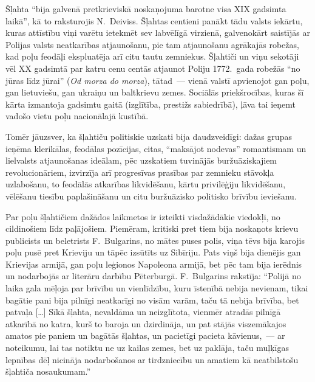 \documentclass[twoside,a5paper,12pt,fleqn,openany]{extbook}
\newcommand{\pltxti}[1]{\textit{\textpolish{#1}}}
\newcommand{\citespace}{[\dots{}]}
\begin{document}
Šļahta ``bija galvenā pretkrieviskā noskaņojuma barotne visa XIX gadsimta laikā'', kā to raksturojis N.~Deiviss. Šļahtas centieni panākt tādu valsts iekārtu, kuras attīstību viņi varētu ietekmēt sev labvēlīgā virzienā, galvenokārt saistījās ar Polijas valsts neatkarības atjaunošanu, pie tam atjaunošanu agrākajās robežas, kad poļu feodāļi ekspluatēja arī citu tautu zemniekus. Šļahtiči un viņu sekotāji vēl XX gadsimtā par katru cenu centās atjaunot Poliju 1772.~gada robežās ``no jūras līdz jūrai'' (\pltxti{Od morza do morza}), tātad~--- vienā valstī apvienojot gan poļu, gan lietuviešu, gan ukraiņu un baltkrievu zemes. Sociālās priekšrocības, kuras šī kārta izmantoja gadsimtu gaitā (izglītība, prestižs sabiedrībā), ļāva tai ieņemt vadošo vietu poļu nacionālajā kustībā.

Tomēr jāuzsver, ka šļahtiču politiskie uzskati bija daudzveidīgi: dažas grupas ieņēma klerikālas, feodālas pozīcijas, citas, ``maksājot nodevas'' romantismam un lielvalsts atjaunošanas ideālam, pēc uzskatiem tuvinājās buržuāziskajiem revolucionāriem, izvirzīja arī progresīvas prasības par zemnieku stāvokļa uzlabošanu, to feodālās atkarības likvidēšanu, kārtu privilēģiju likvidēšanu, vēlēšanu tiesību paplašināšanu un citu buržuāzisko politisko brīvību ieviešanu.

Par poļu šļahtičiem dažādos laikmetos ir izteikti visdažādākie viedokļi, no cildinošiem līdz paļājošiem. Piemēram, kritiski pret tiem bija noskaņots krievu publicists un beletrists F.~Bulgarins, no mātes puses polis, viņa tēvs bija karojis poļu pusē pret Krieviju un tāpēc izsūtīts uz Sibīriju. Pats viņš bija dienējis gan Krievijas armijā, gan poļu leģionos Napoleona armijā, bet pēc tam bija ierēdnis un nodarbojās ar literāru darbību Pēterburgā. F.~Bulgarins rakstīja: ``Polijā no laika gala mēļoja par brīvību un vienlīdzību, kuru īstenībā nebija nevienam, tikai bagātie pani bija pilnīgi neatkarīgi no visām varām, taču tā nebija brīvība, bet patvaļa \citespace{} Sīkā šļahta, nevaldāma un neizglītota, vienmēr atradās pilnīgā atkarībā no katra, kurš to baroja un dzirdināja, un pat stājās viszemākajos amatos pie paniem un bagātās šļahtas, un pacietīgi pacieta kāvienus,~--- ar noteikumu, lai tas notiktu ne uz kailas zemes, bet uz paklāja, taču muļķīgas lepnības dēļ nicināja nodarbošanos ar tirdzniecību un amatiem kā neatbilstošu šļahtiča nosaukumam.''
\end{document}
